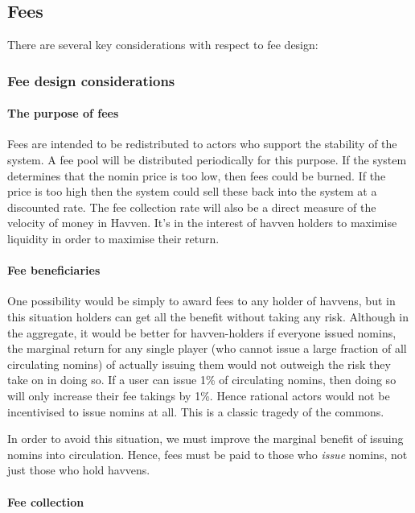 \pagebreak
\subsection{Fees}

There are several key considerations with respect to fee design:

\subsubsection{Fee design considerations}

\paragraph{The purpose of fees}

Fees are intended to be redistributed to actors who support the stability of the system. A fee pool will be distributed periodically for this purpose.
If the system determines that the nomin price is too low, then fees could be burned. If the price is too high then the system could sell these back
into the system at a discounted rate. The fee collection rate will also be a direct measure of the velocity of money in Havven. It's in the interest
of havven holders to maximise liquidity in order to maximise their return.

\paragraph{Fee beneficiaries}

One possibility would be simply to award fees to any holder of havvens,
but in this situation holders can get all the benefit without taking any risk.
Although in the aggregate, it would be better for havven-holders if everyone issued nomins,
the marginal return for any single player (who cannot issue a large fraction of all circulating nomins)
of actually issuing them would not outweigh the risk they take on in doing so. If a user can issue 1\% of circulating
nomins, then doing so will only increase their fee takings by 1\%. Hence rational actors would not be incentivised to issue nomins at all.
This is a classic tragedy of the commons.

\noindent In order to avoid this situation, we must improve the marginal benefit of issuing nomins into circulation.
Hence, fees must be paid to those who \textit{issue} nomins, not just those who hold havvens.

\paragraph{Fee collection}

